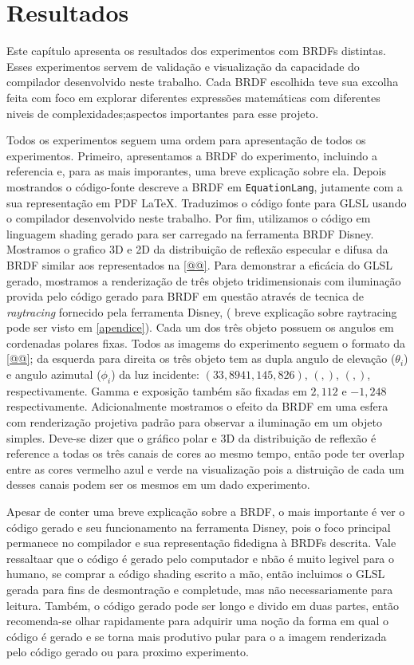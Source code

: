 \chapter{Resultados}
\label{chapter.resultados}


Este capítulo apresenta os resultados dos experimentos com BRDFs distintas. Esses experimentos servem de validação e visualização da capacidade do compilador desenvolvido neste trabalho. Cada BRDF escolhida teve sua excolha feita com foco em explorar diferentes expressões matemáticas com diferentes niveis de complexidades;aspectos importantes para esse projeto.

Todos os experimentos seguem uma ordem para apresentação de todos os experimentos. Primeiro, apresentamos a BRDF do experimento, incluindo a referencia e, para as mais imporantes, uma breve explicação sobre ela. Depois mostrandos o código-fonte descreve a BRDF em \texttt{EquationLang}, jutamente com a sua representação em PDF \LaTeX. Traduzimos o código fonte para GLSL usando o compilador desenvolvido neste trabalho. Por fim, utilizamos o código em linguagem shading gerado para ser carregado na ferramenta BRDF Disney. Mostramos o grafico 3D e 2D da distribuição de reflexão especular e difusa da BRDF similar aos representados na \autoref{@@}. Para demonstrar a eficácia do GLSL gerado, mostramos a renderização de três objeto tridimensionais com iluminação provida pelo código gerado para BRDF em questão através de tecnica de \textit{raytracing} fornecido pela ferramenta Disney, ( breve explicação sobre raytracing pode ser visto em \autoref{apendice}). Cada um dos três objeto possuem os angulos em cordenadas polares fixas. Todos as imagems do experimento seguem o formato da \autoref{@@}; da esquerda para direita os três objeto tem as dupla angulo de elevação ($\theta_i$)  e angulo azimutal ($\phi_i$) da luz incidente: $\left(33,8941, 145,826\right)$, $\left( ,\right)$, $\left( ,\right)$, respectivamente. Gamma e exposição também são fixadas em $2,112$ e $-1,248$ respectivamente. Adicionalmente mostramos o efeito da BRDF em uma esfera com renderização projetiva padrão para observar a iluminação em um objeto simples.
Deve-se dizer que o gráfico polar e 3D da distribuição de reflexão é reference a todas os três canais de cores ao mesmo tempo, então pode ter overlap entre as cores vermelho azul e verde na visualização pois a distruição de cada um desses canais podem ser os mesmos em um dado experimento.



Apesar de conter uma breve explicação sobre a BRDF, o mais importante é ver o código gerado e seu funcionamento na ferramenta Disney, pois o foco principal permanece no compilador e sua representação fidedigna à BRDFs descrita.  Vale ressaltaar que o código é gerado pelo computador e nbão é muito legivel para o humano, se comprar a código shading escrito a mão, então incluimos o GLSL gerada para fins de desmontração e completude, mas não necessariamente para leitura. Também, o código gerado pode ser longo e divido em duas partes, então recomenda-se olhar rapidamente para adquirir uma noção da forma em qual o código é gerado e se torna mais produtivo pular para o a imagem renderizada pelo código gerado ou para proximo experimento.


